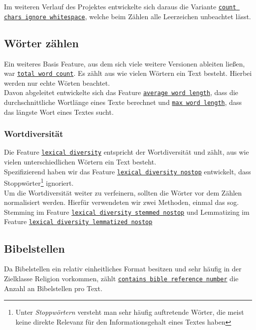 \documentclass[
	11pt,
	a4paper
]{scrartcl}
\newcommand{\code}[1]{\texttt{\ul{#1}}}
\begin{document}
Im weiteren Verlauf des Projektes entwickelte sich daraus die Variante \code{count chars ignore whitespace}, welche beim Zählen alle
Leerzeichen unbeachtet lässt. 

\subsection{Wörter zählen}\label{woerterZaehlen}
Ein weiteres Basis Feature, aus dem sich viele weitere Versionen ableiten ließen, war \code{total word count}. Es zählt aus wie vielen
Wörtern ein Text besteht. Hierbei werden nur echte Wörten beachtet.\\
Davon abgeleitet entwickelte sich das Feature \code{average word length}, dass die durchschnittliche Wortlänge eines Texte berechnet und
\code{max word length}, dass das längste Wort eines Textes sucht.

\subsubsection{Wortdiversität}\label{wortdiversitaet}
Die Feature \code{lexical diversity} entspricht der Wortdiversität und zählt, aus wie vielen unterschiedlichen Wörtern ein Text besteht.\\
Spezifizierend haben wir das Feature \code{lexical diversity nostop} entwickelt, dass Stoppwörter\footnote{Unter \emph{Stoppwörtern}
versteht man sehr häufig auftretende Wörter, die meist keine direkte Relevanz für den Informationsgehalt eines Textes haben} ignoriert. \\

Um die Wortdiversität weiter zu verfeinern, sollten die Wörter vor dem Zählen normalisiert werden. Hierfür verwendeten wir zwei Methoden,
einmal das sog. Stemming im Feature \code{lexical diversity stemmed nostop} und Lemmatizing im Feature \code{lexical diversity lemmatized
nostop}

\subsection{Bibelstellen}\label{bibelstellen}
Da Bibelstellen ein relativ einheitliches Format besitzen und sehr häufig in der Zielklasse Religion vorkommen, zählt \code{contains bible
reference number} die Anzahl an Bibelstellen pro Text.
\end{document}
